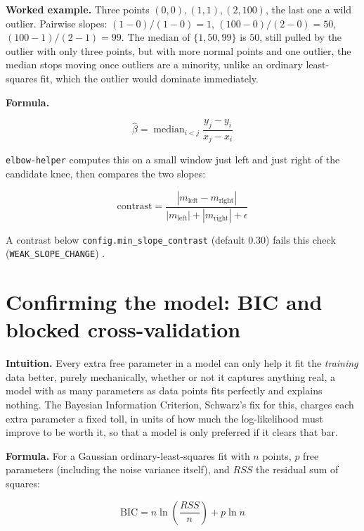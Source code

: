\documentclass[11pt]{article}
\newcommand{\code}[1]{\texttt{#1}}
\begin{document}
\textbf{Worked example.} Three points $(0,0), (1,1), (2,100)$, the last one
a wild outlier. Pairwise slopes: $(1-0)/(1-0)=1$, $(100-0)/(2-0)=50$,
$(100-1)/(2-1)=99$. The median of $\{1, 50, 99\}$ is $50$, still pulled by
the outlier with only three points, but with more normal points and one
outlier, the median stops moving once outliers are a minority, unlike an
ordinary least-squares fit, which the outlier would dominate immediately.

\textbf{Formula.}

\begin{equation}
\hat\beta = \operatorname{median}_{i < j} \frac{y_j - y_i}{x_j - x_i}
\end{equation}

\code{elbow-helper} computes this on a small window just left and just
right of the candidate knee, then compares the two slopes:

\begin{equation}
\text{contrast} = \frac{|m_{\text{left}} - m_{\text{right}}|}{|m_{\text{left}}| + |m_{\text{right}}| + \epsilon}
\end{equation}

A contrast below \code{config.\allowbreak min\_slope\_contrast} (default $0.30$) fails
this check (\code{WEAK\_SLOPE\_CHANGE}) \citep{theil1950} \citep{sen1968}.

\section{Confirming the model: BIC and blocked cross-validation}
\label{sec:bic-cv}

\textbf{Intuition.} Every extra free parameter in a model can only help it
fit the \emph{training} data better, purely mechanically, whether or not it
captures anything real, a model with as many parameters as data points fits
perfectly and explains nothing. The Bayesian Information Criterion,
Schwarz's fix for this, charges each extra parameter a fixed toll, in units
of how much the log-likelihood must improve to be worth it, so that a model
is only preferred if it clears that bar.

\textbf{Formula.} For a Gaussian ordinary-least-squares fit with $n$
points, $p$ free parameters (including the noise variance itself), and
$RSS$ the residual sum of squares:

\begin{equation}
\mathrm{BIC} = n \ln\!\left(\frac{RSS}{n}\right) + p \ln n
\end{equation}
\end{document}
